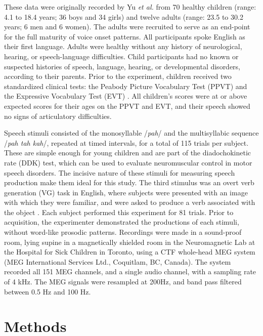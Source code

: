 \documentclass[a4paper]{article}
\begin{document}
These data were originally recorded by Yu {\em et al.} \cite{Yu2014,Yu2015} from 70 healthy children (range: 4.1 to 18.4 years; 36 boys and 34 girls) and twelve adults (range: 23.5 to 30.2 years; 6 men and 6 women). The adults were recruited to serve as an end-point for the full maturity of voice onset patterns. All participants spoke English as their first language. Adults were healthy without any history of neurological, hearing, or speech-language difficulties. Child participants had no known or suspected histories of speech, language, hearing, or developmental disorders, according to their parents. Prior to the experiment, children received two standardized clinical tests: the Peabody Picture Vocabulary Test (PPVT) \cite{Dunn97} and the Expressive Vocabulary Test (EVT) \cite{EVT}. All children's scores were at or above expected scores for their ages on the PPVT and EVT, and their speech showed no signs of articulatory difficulties.

Speech stimuli consisted of the monosyllable /{\em pah}/ and the multisyllabic sequence /{\em pah tah kah}/, repeated at timed intervals, for a total of 115 trials per subject. These are simple enough for young children and are part of the diadochokinetic rate (DDK) test, which can be used to evaluate neuromuscular control in motor speech disorders. The incisive nature of these stimuli for measuring speech production make them ideal for this study. The third stimulus was an overt verb generation (VG) task in English, where subjects were presented with an image with which they were familiar, and were asked to produce a verb associated with the object \cite{Doesburg2016}. Each subject performed this experiment for 81 trials.  Prior to acquisition, the experimenter demonstrated the productions of each stimuli, without word-like prosodic patterns. Recordings were made in a sound-proof room, lying supine in a magnetically shielded room in the Neuromagnetic Lab at the Hospital for Sick Children in Toronto, using a CTF whole-head MEG system (MEG International Services Ltd., Coquitlam, BC, Canada). The system recorded all 151 MEG channels, and a single audio channel, with a sampling rate of 4 kHz. The MEG signals were resampled at 200Hz, and band pass filtered between 0.5 Hz and 100 Hz.

\section{Methods}

\end{document}
